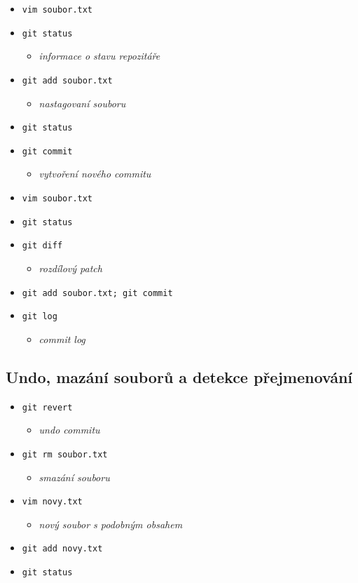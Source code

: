 \documentclass[10pt,twocolumn]{article}
\begin{document}
\begin{itemize}
  \item \texttt{vim soubor.txt}
  \item \texttt{git status}
  \begin{itemize} \item \textit{informace o stavu repozitáře} \end{itemize}
  \item \texttt{git add soubor.txt}
  \begin{itemize} \item \textit{nastagovaní souboru} \end{itemize}
  \item \texttt{git status}
  \item \texttt{git commit}
  \begin{itemize} \item \textit{vytvoření nového commitu} \end{itemize}
  \item \texttt{vim soubor.txt}
  \item \texttt{git status}
  \item \texttt{git diff}
  \begin{itemize} \item \textit{rozdílový patch} \end{itemize}
  \item \texttt{git add soubor.txt; git commit}
  \item \texttt{git log}
  \begin{itemize} \item \textit{commit log} \end{itemize}
\end{itemize}

\subsection{Undo, mazání souborů a detekce přejmenování}

\begin{itemize}
  \item \texttt{git revert}
  \begin{itemize} \item \textit{undo commitu} \end{itemize}
  \item \texttt{git rm soubor.txt}
  \begin{itemize} \item \textit{smazání souboru} \end{itemize}
  \item \texttt{vim novy.txt}
  \begin{itemize} \item \textit{nový soubor s podobným obsahem} \end{itemize}
  \item \texttt{git add novy.txt}
  \item \texttt{git status}
\end{itemize}
\end{document}
